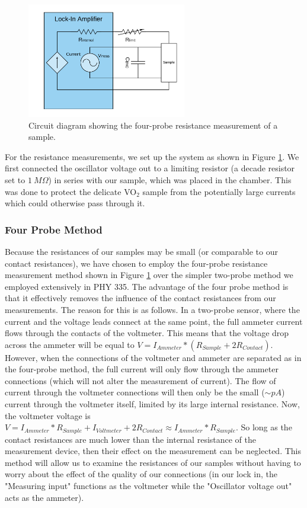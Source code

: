 \documentclass[%
 reprint,
 amsmath,amssymb,
 aps,
 pra,
]{revtex4-1}
\begin{document}
\begin{figure}[H]
	\centering
	\includegraphics[height=5cm]{diagram_res.png}
	\caption{Circuit diagram showing the four-probe resistance measurement of a sample.}
	\label{fig:ResistanceMeasurements}
\end{figure}

For the resistance measurements, we set up the system as shown in Figure \ref{fig:ResistanceMeasurements}. We first connected the oscillator voltage out to a limiting resistor (a decade resistor set to $1~M\Omega$) in series with our sample, which was placed in the chamber. This was done to protect the delicate VO$_2$ sample from the potentially large currents which could otherwise pass through it.

\subsubsection{Four Probe Method}

Because the resistances of our samples may be small (or comparable to our contact resistances), we have chosen to employ the four-probe resistance measurement method shown in Figure \ref{fig:ResistanceMeasurements} over the simpler two-probe method we employed extensively in PHY 335. The advantage of the four probe method is that it effectively removes the influence of the contact resistances from our measurements. The reason for this is as follows. In a two-probe sensor, where the current and the voltage leads connect at the same point, the full ammeter current flows through the contacts of the voltmeter. This means that the voltage drop across the ammeter will be equal to $V = I_{Ammeter}*(R_{Sample} + 2R_{Contact})$. However, when the connections of the voltmeter and ammeter are separated as in the four-probe method, the full current will only flow through the ammeter connections (which will not alter the measurement of current). The flow of current through the voltmeter connections will then only be the small ($\sim pA$) current through the voltmeter itself, limited by its large internal resistance. Now, the voltmeter voltage is $V = I_{Ammeter}*R_{Sample} + I_{Voltmeter} + 2R_{Contact} \approx I_{Ammeter}*R_{Sample}$. So long as the contact resistances are much lower than the internal resistance of the measurement device, then their effect on the measurement can be neglected. This method will allow us to examine the resistances of our samples without having to worry about the effect of the quality of our connections (in our lock in, the "Measuring input" functions as the voltmeter while the "Oscillator voltage out" acts as the ammeter).
\end{document}
